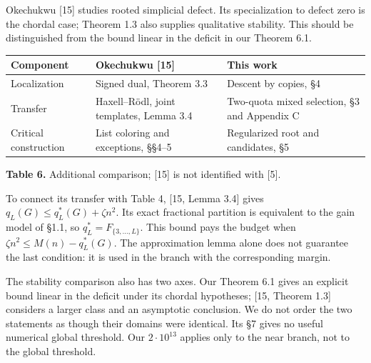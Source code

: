 \documentclass[english,11pt,a4paper]{article}
\newcounter{none}
\begin{document}
Okechukwu {[}15{]} studies rooted simplicial defect. Its specialization to defect zero is the chordal case; Theorem 1.3 also supplies qualitative stability. This should be distinguished from the bound linear in the deficit in our Theorem 6.1.


{\def\LTcaptype{none} %
\begin{longtable}[c]{@{}
  >{\raggedright\arraybackslash}p{}
  >{\raggedright\arraybackslash}p{}
  >{\raggedright\arraybackslash}p{}@{}}
\toprule\noalign{}
\begin{minipage}[b]{\linewidth}\raggedright
Component
\end{minipage} & \begin{minipage}[b]{\linewidth}\raggedright
Okechukwu {[}15{]}
\end{minipage} & \begin{minipage}[b]{\linewidth}\raggedright
This work
\end{minipage} \\
\midrule\noalign{}
\endhead
\bottomrule\noalign{}
\endlastfoot
Localization & Signed dual, Theorem 3.3 & Descent by copies, §4 \\
Transfer & Haxell--Rödl, joint templates, Lemma 3.4 & Two-quota mixed selection, §3 and Appendix C \\
Critical construction & List coloring and exceptions, §§4--5 & Regularized root and candidates, §5 \\
\end{longtable}
}

\textbf{Table 6.} Additional comparison; {[}15{]} is not identified with {[}5{]}.

To connect its transfer with Table 4, {[}15, Lemma 3.4{]} gives \(q_L(G)\le q_L^*(G)+\zeta n^2\). Its exact fractional partition is equivalent to the gain model of §1.1, so \(q_L^*=F_{\{3,\ldots,L\}}\). This bound pays the budget when \(\zeta n^2\le M(n)-q_L^*(G)\). The approximation lemma alone does not guarantee the last condition: it is used in the branch with the corresponding margin.

The stability comparison also has two axes. Our Theorem 6.1 gives an explicit bound linear in the deficit under its chordal hypotheses; {[}15, Theorem 1.3{]} considers a larger class and an asymptotic conclusion. We do not order the two statements as though their domains were identical. Its §7 gives no useful numerical global threshold. Our \(2\cdot10^{13}\) applies only to the near branch, not to the global threshold.
\end{document}
